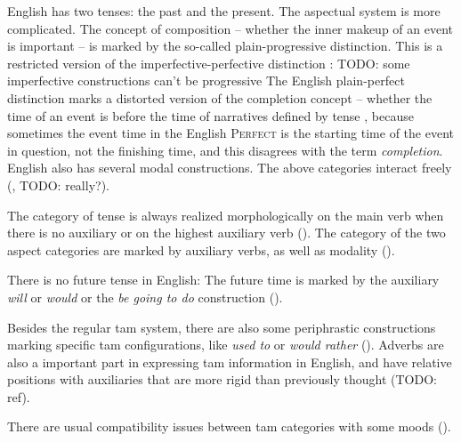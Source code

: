 \documentclass[UTF8, a4paper, oneside, scheme=plain]{ctexrep}
\newcommand*{\citesec}[1]{\S~{#1}}
\newcommand*{\term}[1]{\emph{#1}}
\newcommand{\corpus}[1]{\emph{#1}}
\newcommand{\category}[1]{\textsc{#1}}
\begin{document}
English has two tenses: the past and the present.
The aspectual system is more complicated. 
The concept of composition 
-- whether the inner makeup of an event is important \citep[\citesec{19.10}]{dixon2012basic3} -- 
is marked by the so-called plain-progressive distinction.
This is a restricted version of the imperfective-perfective distinction \citep{dixon2012basic3}:
TODO: some imperfective constructions can't be progressive
The English plain-perfect distinction marks 
a distorted version of the completion concept 
-- whether the time of an event is before the time of narratives defined by tense 
\citep[\citesec{19.7}]{dixon2012basic3},
because sometimes the event time in the English \category{Perfect} 
is the starting time of the event in question,
not the finishing time,
and this disagrees with the term \term{completion}.
English also has several modal constructions.
The above categories interact freely (, TODO: really?).

The category of tense is always realized morphologically 
on the main verb when there is no auxiliary 
or on the highest auxiliary verb ().
The category of the two aspect categories are marked by auxiliary verbs, 
as well as modality (). 

There is no future tense in English:
The future time is marked by the auxiliary \corpus{will} or \corpus{would} 
or the \corpus{be going to do} construction ().

Besides the regular \acs{tam} system,
there are also some periphrastic constructions marking specific \acs{tam} configurations,
like \corpus{used to} or \corpus{would rather} ().
Adverbs are also a important part in expressing \acs{tam} information in English,
and have relative positions with auxiliaries that are more rigid than previously thought (TODO: ref).

There are usual compatibility issues between \acs{tam} categories 
with some moods ().
\end{document}
